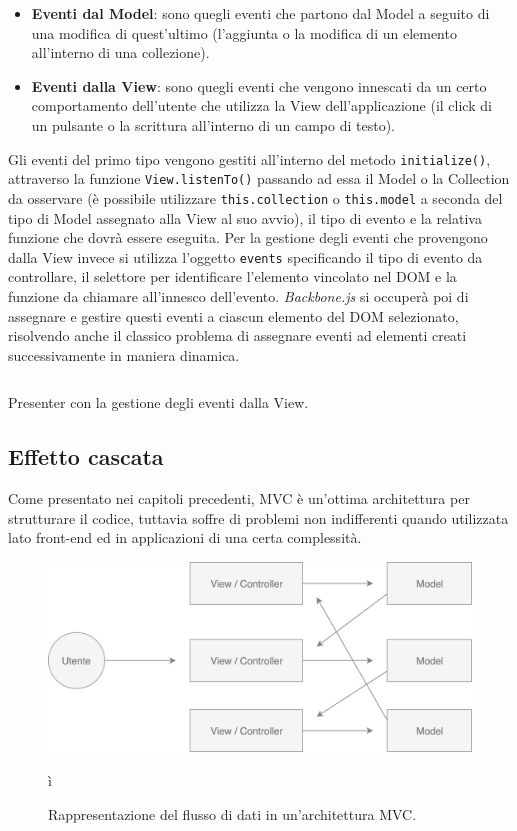\begin{itemize}
    \item \textbf{Eventi dal Model}: sono quegli eventi che partono dal Model a seguito di una modifica di quest'ultimo (l'aggiunta o la modifica di un elemento all'interno di una collezione).
    \item \textbf{Eventi dalla View}: sono quegli eventi che vengono innescati da un certo comportamento dell'utente che utilizza la View dell'applicazione (il click di un pulsante o la scrittura all'interno di un campo di testo).
\end{itemize}

\noindent
Gli eventi del primo tipo vengono gestiti all'interno del metodo \texttt{initialize()}, attraverso la funzione \texttt{View.listenTo()} passando ad essa il Model o la Collection da osservare (è possibile utilizzare \texttt{this.collection} o \texttt{this.model} a seconda del tipo di Model assegnato alla View al suo avvio), il tipo di evento e la relativa funzione che dovrà essere eseguita.
Per la gestione degli eventi che provengono dalla View invece si utilizza l'oggetto \texttt{events} specificando il tipo di evento da controllare, il selettore per identificare l'elemento vincolato nel DOM e la funzione da chiamare all'innesco dell'evento. \textit{Backbone.js} si occuperà poi di assegnare e gestire questi eventi a ciascun elemento del DOM selezionato, risolvendo anche il classico problema di assegnare eventi ad elementi creati successivamente in maniera dinamica.

\begin{listing}[ht]
\inputminted{javascript}{sources/applicationMVCPresenterEvents.js}
\caption{Presenter con la gestione degli eventi dalla View.} 
\label{applicationMVCPresenterEvents} 
\end{listing} 

\subsection{Effetto cascata}
Come presentato nei capitoli precedenti, MVC è un'ottima architettura per strutturare il codice, tuttavia soffre di problemi non indifferenti quando utilizzata lato front-end ed in applicazioni di una certa complessità.

\begin{figure}[h]
\centering
\includegraphics[width=12cm]{./images/MVCDataFlow}
\caption{Rappresentazione del flusso di dati in un'architettura MVC.}
\label{MVCDataFlow}ì
\end{figure}

